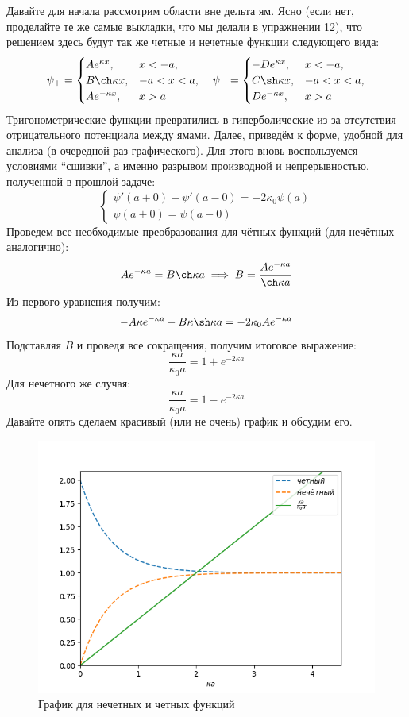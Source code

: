 Давайте для начала рассмотрим области вне дельта ям. Ясно (если нет, проделайте те же самые выкладки, что мы делали в упражнении 12), что решением здесь будут так же четные и нечетные функции следующего вида:
\[
\psi_+ =
\begin{cases}
    A e^{\kappa x}, & x < -a,\\
    B \ch \kappa x, & -a < x < a,\\
    Ae^{-\kappa x},& x > a
\end{cases}\quad
\psi_- =
\begin{cases}
    -De^{\kappa x},& x < -a,\\
    C \sh \kappa x, & -a < x < a,\\
    De^{-\kappa x},& x > a
\end{cases}
\]
Тригонометрические функции превратились в гиперболические из-за отсутствия отрицательного потенциала между ямами. Далее, приведём к форме, удобной для анализа (в очередной раз графического). Для этого вновь воспользуемся условиями ``сшивки'', а именно разрывом производной и непрерывностью, полученной в прошлой задаче:
\[
\begin{cases}
\psi'(a+0) - \psi'(a-0) = -2\kappa_0\psi(a)\\
\psi(a+0) = \psi(a-0)    
\end{cases}
\]
Проведем все необходимые преобразования для чётных функций (для нечётных аналогично):
\[
Ae^{-\kappa a} = B \ch \kappa a \implies B = \frac{Ae^{-\kappa a}}{\ch \kappa a}
\]
Из первого уравнения получим:
\[
-A\kappa e^{-\kappa a} - B\kappa \sh \kappa a = -2\kappa_0 Ae^{-\kappa a}
\]
Подставляя $B$ и проведя все сокращения, получим итоговое выражение:
\[
\frac{\kappa a}{\kappa_0 a} = 1 + e^{-2\kappa a}
\]
Для нечетного же случая:
\[
\frac{\kappa a}{\kappa_0 a} = 1 - e^{-2\kappa a}
\]
Давайте опять сделаем красивый (или не очень) график и обсудим его.
\begin{figure}[!ht]
\centering
\includegraphics[scale=0.8]{class_4/images/delta.png}
\caption{График для нечетных и четных функций}
\label{fig 4.4}
\end{figure}

